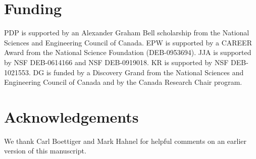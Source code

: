 \documentclass[letterpaper,twocolumn,superscriptaddress,showkeys,longbibliography]{revtex4-1}
\begin{document}
\section{Funding}

PDP is supported by an Alexander Graham Bell scholarship from the National
Sciences and Engineering Council of Canada. EPW is supported by a CAREER Award
from the National Science Foundation (DEB-0953694). JJA is supported by NSF
DEB-0614166 and NSF DEB-0919018. KR is supported by NSF DEB-1021553. DG is
funded by a Discovery Grand from the National Sciences and Engineering Council
of Canada and by the Canada Research Chair program.

\section{Acknowledgements}

We thank Carl Boettiger and Mark Hahnel for helpful comments on an earlier
version of this manuscript.

\newpage

\end{document}
